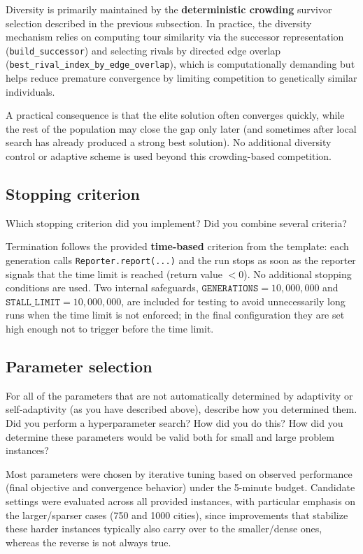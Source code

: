 \documentclass[a4paper,10pt]{article}
\newcommand{\ReplaceMe}[1]{{\color{blue}#1}}
\begin{document}
Diversity is primarily maintained by the \textbf{deterministic crowding} survivor selection described in the
previous subsection. In practice, the diversity mechanism relies on computing tour similarity via the successor
representation (\texttt{build\_successor}) and selecting rivals by directed edge overlap
(\texttt{best\_rival\_index\_by\_edge\_overlap}), which is computationally demanding but helps reduce premature
convergence by limiting competition to genetically similar individuals.

A practical consequence is that the elite solution often converges quickly, while the rest of the population may
close the gap only later (and sometimes after local search has already produced a strong best solution). No
additional diversity control or adaptive scheme is used beyond this crowding-based competition.


\subsection{Stopping criterion}

\ReplaceMe{Which stopping criterion did you implement? Did you combine several criteria?}

Termination follows the provided \textbf{time-based} criterion from the template: each generation calls
\texttt{Reporter.report(...)} and the run stops as soon as the reporter signals that the time limit is reached
(return value $<0$). No additional stopping conditions are used. Two internal safeguards,
$\texttt{GENERATIONS}=10{,}000{,}000$ and $\texttt{STALL\_LIMIT}=10{,}000{,}000$, are included for testing to
avoid unnecessarily long runs when the time limit is not enforced; in the final configuration they are set high
enough not to trigger before the time limit.


\subsection{Parameter selection}

\ReplaceMe{For all of the parameters that are not automatically determined by adaptivity or self-adaptivity (as you have described above), describe how you determined them. Did you perform a hyperparameter search? How did you do this? How did you determine these parameters would be valid both for small and large problem instances?}

Most parameters were chosen by iterative tuning based on observed performance (final objective and convergence
behavior) under the 5-minute budget. Candidate settings were evaluated across all provided instances, with
particular emphasis on the larger/sparser cases (750 and 1000 cities), since improvements that stabilize these
harder instances typically also carry over to the smaller/dense ones, whereas the reverse is not always true.
\end{document}

